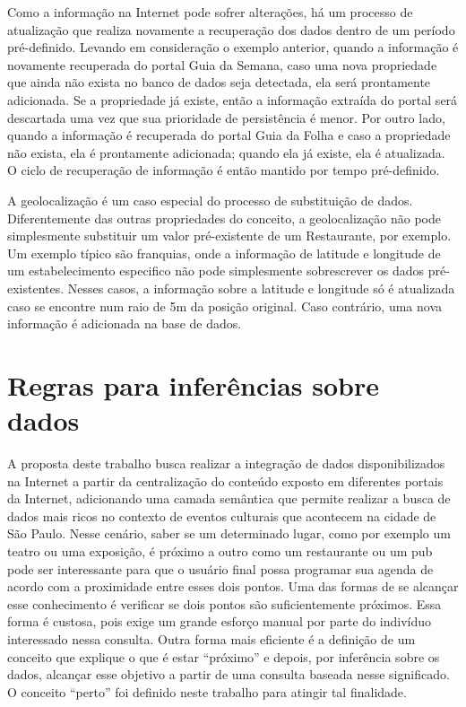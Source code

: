 Como a informação na Internet pode sofrer alterações, há um processo de atualização que realiza novamente a recuperação dos dados dentro de um período pré-definido. Levando em consideração o exemplo anterior, quando a informação é novamente recuperada do portal Guia da Semana, caso uma nova propriedade que ainda não exista no banco de dados seja detectada, ela será prontamente adicionada. Se a propriedade já existe, então a informação extraída do portal será descartada uma vez que sua prioridade de persistência é menor. Por outro lado, quando a informação é recuperada do portal Guia da Folha e caso a propriedade não exista, ela é prontamente adicionada; quando ela já existe, ela é atualizada. O ciclo de recuperação de informação é então mantido por tempo pré-definido. 

A geolocalização é um caso especial do processo de substituição de dados. Diferentemente das outras propriedades do conceito, a geolocalização não pode simplesmente substituir um valor pré-existente de um Restaurante, por exemplo. Um exemplo típico são franquias, onde a informação de latitude e longitude de um estabelecimento  especifico não pode simplesmente sobrescrever os dados pré-existentes.  Nesses casos, a informação sobre a latitude e longitude só é atualizada caso se encontre num raio de 5m da posição original. Caso contrário, uma nova informação é adicionada na base de dados.

\section{Regras para inferências sobre dados}
\label{sec:regras_inferencia_dados}

A proposta deste trabalho busca realizar a integração de dados disponibilizados na Internet a partir da centralização do conteúdo exposto em diferentes portais da Internet, adicionando uma camada semântica que permite realizar a busca de dados mais ricos no contexto de eventos culturais que acontecem na cidade de São Paulo. Nesse cenário, saber se um determinado lugar, como por exemplo um teatro ou uma exposição, é próximo a outro como um restaurante ou um pub pode ser interessante para que o usuário final possa programar sua agenda de acordo com a proximidade entre esses dois pontos. Uma das formas de se alcançar esse conhecimento é verificar se dois pontos são suficientemente próximos. Essa forma é custosa, pois exige um grande esforço manual por parte do indivíduo interessado nessa consulta. Outra forma mais eficiente é a definição de um conceito que explique o que é estar ``próximo'' e depois, por inferência sobre os dados, alcançar esse objetivo a partir de uma consulta baseada nesse significado. O conceito ``perto'' foi definido neste trabalho para atingir tal finalidade.

